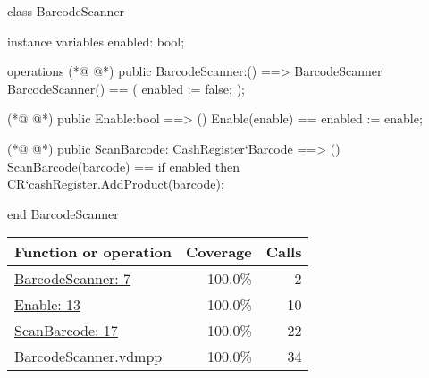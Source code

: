\begin{vdmpp}
class BarcodeScanner

instance variables
 enabled: bool;
 
operations
(*@
\label{BarcodeScanner:7}
@*)
 public BarcodeScanner:() ==> BarcodeScanner
 BarcodeScanner() ==
 (
  enabled := false;
 );

(*@
\label{Enable:13}
@*)
 public Enable:bool ==> ()
 Enable(enable) ==
  enabled := enable;

(*@
\label{ScanBarcode:17}
@*)
 public ScanBarcode: CashRegister`Barcode ==> ()
 ScanBarcode(barcode) ==
  if enabled then
   CR`cashRegister.AddProduct(barcode);
   
end BarcodeScanner
\end{vdmpp}
\bigskip
\begin{longtable}{|l|r|r|}
\hline
Function or operation & Coverage & Calls \\
\hline
\hline
\hyperref[BarcodeScanner:7]{BarcodeScanner: 7} & 100.0\% & 2 \\
\hline
\hyperref[Enable:13]{Enable: 13} & 100.0\% & 10 \\
\hline
\hyperref[ScanBarcode:17]{ScanBarcode: 17} & 100.0\% & 22 \\
\hline
\hline
BarcodeScanner.vdmpp & 100.0\% & 34 \\
\hline
\end{longtable}

